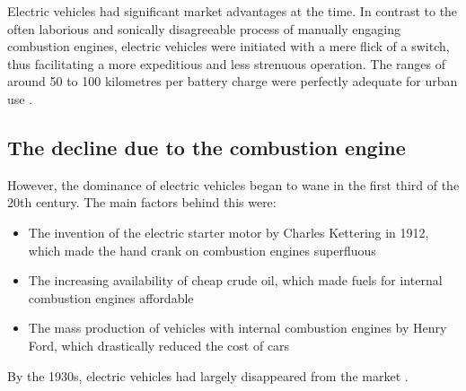 Electric vehicles had significant market advantages at the time. In contrast to the often laborious and sonically disagreeable process of manually engaging combustion engines, electric vehicles were initiated with a mere flick of a switch, thus facilitating a more expeditious and less strenuous operation.\autocite{enbw_elektroautos_vorteile_nachteile} %
The ranges of around 50 to 100 kilometres per battery charge were perfectly adequate for urban use \autocite{adac_stromverbrauch_elektroautos}.
\clearpage

\subsection*{The decline due to the combustion engine}

However, the dominance of electric vehicles began to wane in the first third of the 20th century. The main factors behind this were:
\begin{itemize}
	\item %
	The invention of the electric starter motor by Charles Kettering in 1912, which made the hand crank on combustion engines superfluous \autocite{greelane_charles_kettering}
	\item %
	The increasing availability of cheap crude oil, which made fuels for internal combustion engines affordable \autocite{tanke_guenstig_oelpreise}
	\item %
	The mass production of vehicles with internal combustion engines by Henry Ford, which drastically reduced the cost of cars \autocite{ardalpha_henry_ford_geschichte}
\end{itemize}
By the 1930s, electric vehicles had largely disappeared from the market	\autocite{ardalpha_henry_ford_geschichte}.
